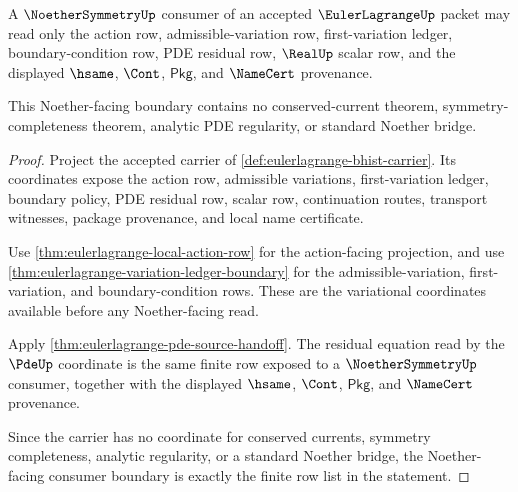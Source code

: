 \begin{theorem}
\label{thm:eulerlagrange-noether-boundary-consumer-row}
A $\NoetherSymmetryUp$ consumer of an accepted $\EulerLagrangeUp$ packet may
read only the action row, admissible-variation row, first-variation ledger,
boundary-condition row, PDE residual row, $\RealUp$ scalar row, and the
displayed $\hsame$, $\Cont$, $\mathsf{Pkg}$, and $\NameCert$ provenance.

This Noether-facing boundary contains no conserved-current theorem,
symmetry-completeness theorem, analytic PDE regularity, or standard Noether
bridge.
\end{theorem}
\begin{proof}
Project the accepted carrier of \autoref{def:eulerlagrange-bhist-carrier}. Its
coordinates expose the action row, admissible variations, first-variation
ledger, boundary policy, PDE residual row, scalar row, continuation routes,
transport witnesses, package provenance, and local name certificate.

Use \autoref{thm:eulerlagrange-local-action-row} for the action-facing
projection, and use
\autoref{thm:eulerlagrange-variation-ledger-boundary} for the
admissible-variation, first-variation, and boundary-condition rows. These are
the variational coordinates available before any Noether-facing read.

Apply \autoref{thm:eulerlagrange-pde-source-handoff}. The residual equation
read by the $\PdeUp$ coordinate is the same finite row exposed to a
$\NoetherSymmetryUp$ consumer, together with the displayed $\hsame$, $\Cont$,
$\mathsf{Pkg}$, and $\NameCert$ provenance.

Since the carrier has no coordinate for conserved currents, symmetry
completeness, analytic regularity, or a standard Noether bridge, the
Noether-facing consumer boundary is exactly the finite row list in the
statement.
\end{proof}

